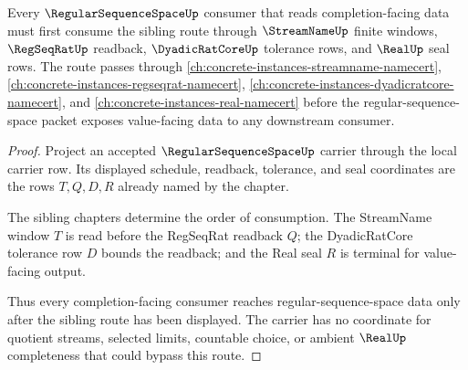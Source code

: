 \begin{theorem}
\label{thm:regular-sequence-space-sibling-route}
Every $\RegularSequenceSpaceUp$ consumer that reads completion-facing data must first consume the sibling route through $\StreamNameUp$ finite windows, $\RegSeqRatUp$ readback, $\DyadicRatCoreUp$ tolerance rows, and $\RealUp$ seal rows. The route passes through \autoref{ch:concrete-instances-streamname-namecert}, \autoref{ch:concrete-instances-regseqrat-namecert}, \autoref{ch:concrete-instances-dyadicratcore-namecert}, and \autoref{ch:concrete-instances-real-namecert} before the regular-sequence-space packet exposes value-facing data to any downstream consumer.
\end{theorem}
\begin{proof}
Project an accepted $\RegularSequenceSpaceUp$ carrier through the local carrier row. Its displayed schedule, readback, tolerance, and seal coordinates are the rows $T,Q,D,R$ already named by the chapter.

The sibling chapters determine the order of consumption. The StreamName window $T$ is read before the RegSeqRat readback $Q$; the DyadicRatCore tolerance row $D$ bounds the readback; and the Real seal $R$ is terminal for value-facing output.

Thus every completion-facing consumer reaches regular-sequence-space data only after the sibling route has been displayed. The carrier has no coordinate for quotient streams, selected limits, countable choice, or ambient $\RealUp$ completeness that could bypass this route.
\end{proof}
